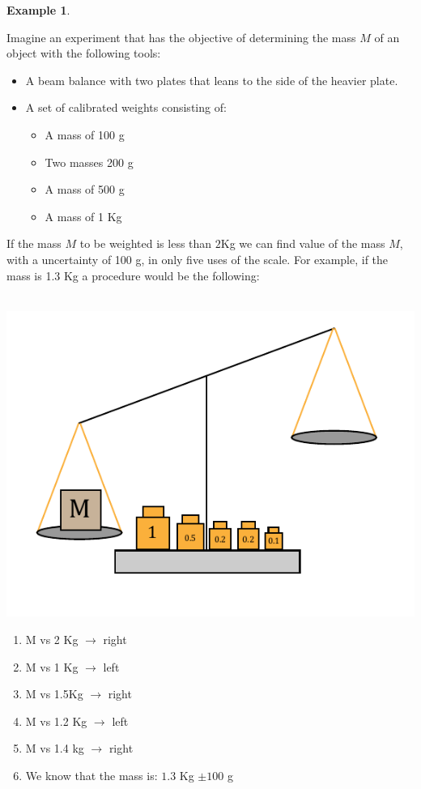 \documentclass[11pt,a4paper,twoside]{report}
\newcommand{\+}{\textnormal{+} }
\theoremstyle{definition}
\newtheorem{myex}[mythm]{Example}
\numberwithin{equation}{chapter}
\begin{document}
\begin{myex} \label{scalex}
  
  Imagine an experiment that has the objective of determining the mass $M$ of an
  object with the following tools:
  
  \begin{itemize}
    \item A beam balance with two plates that leans to the side of the heavier
    plate. 
    \item A set of calibrated weights consisting of:
    \begin{itemize}
      \item A mass of 100 g
      \item Two masses 200 g
      \item A mass of 500 g
      \item A mass of 1 Kg
    \end{itemize}  
  \end{itemize}

If the mass $M$ to be weighted is less than $2$Kg we can find value of the mass
$M$, with a uncertainty of 100 g, in only five uses of the scale. For example,
if the mass is 1.3 Kg a procedure would be the following:
\\\\
\begin{minipage}[]{0.5\linewidth}
  \centering
  \strut\vspace*{-\baselineskip}\newline\includegraphics[width=0.8\linewidth]{figures/scale.pdf}
\end{minipage}
\begin{minipage}[]{0.4\linewidth}
  \begin{enumerate}
  \item M vs 2 Kg $\rightarrow$ right
  \item M vs 1 Kg $\rightarrow$ left
  \item  M vs 1.5Kg $\rightarrow$ right
  \item  M vs 1.2 Kg $\rightarrow$ left
  \item  M vs 1.4 kg $\rightarrow$ right
  \item  We know that the mass is: $1.3$ Kg $\pm 100$ g
\end{enumerate}
\end{minipage}
\\\\


\end{myex}
\end{document}

